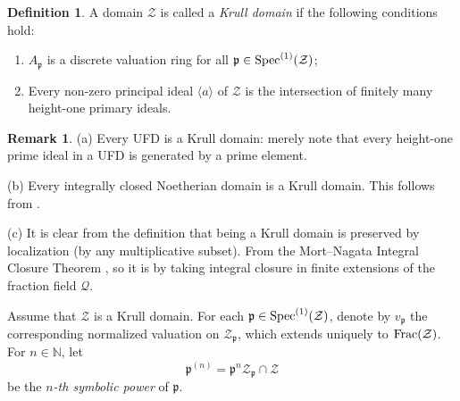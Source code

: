 \documentclass[11pt,a4paper,reqno]{amsart}
\def\N{\mathbb{N}}
\def\s1{{\rm Spec}^{(1)}}
\theoremstyle{definition}
\newtheorem{defn}[thm]{Definition}
\newtheorem{exa}[thm]{Example}
\newtheorem{rmk}[thm]{Remark}
\begin{document}
\begin{defn}\label{def:krulring}
A domain $\mathcal Z$ is called a \emph{Krull domain} if the following conditions hold:
\begin{enumerate}
\item $A_{\mathfrak{p}}$ is a discrete valuation ring for all $\mathfrak{p} \in \s1(\mathcal Z)$; 
\item Every non-zero principal ideal $\langle a  \rangle$ of $\mathcal Z$ is the intersection of finitely many height-one primary ideals.
\end{enumerate}
\end{defn}

\begin{rmk} \label{rmk:Krull-domain}
(a) Every UFD is a Krull domain: merely note that every height-one prime ideal in a UFD is generated by a prime element.
\vskip 1mm

\noindent
(b) Every integrally closed Noetherian domain is a Krull domain. This follows from \cite[\S 17.H, Theorem 37, Theorem 38]{Mat80}.
\vskip 1mm

\noindent
(c) It is clear from the definition that being a Krull domain is preserved by localization (by any multiplicative subset). From the Mort--Nagata Integral Closure Theorem \cite[\S 41.B]{Mat80}, so it is by taking integral closure in finite extensions of the fraction field ${\mathcal Q}$. 
\end{rmk}


Assume that $\mathcal Z$ is a Krull domain. For each $\mathfrak{p} \in \s1(\mathcal Z)$, denote by $v_{\mathfrak{p}}$ the corresponding normalized valuation on $\mathcal{Z}_{\mathfrak{p}}$, which extends uniquely to ${\rm Frac}(\mathcal Z )$. For $n \in \N$, let 
$$
\mathfrak{p}^{(n)}=\mathfrak{p}^n\mathcal{Z}_{\mathfrak{p}} \cap \mathcal{Z}
$$ be the \emph{$n$-th symbolic power} of $\mathfrak{p}$.

\end{document}
